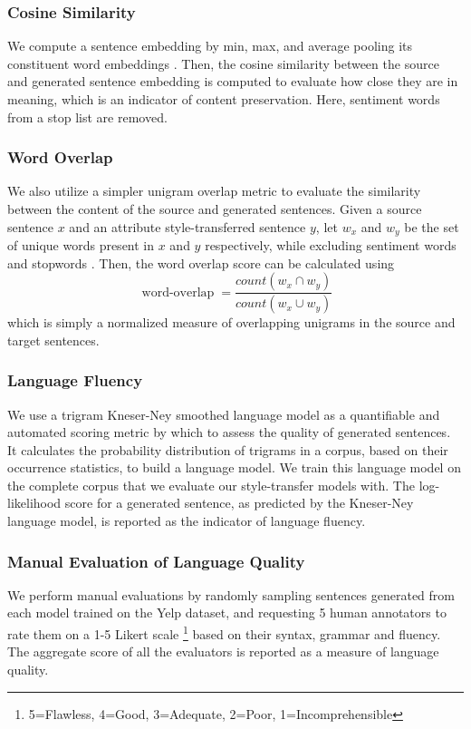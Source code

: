 \documentclass[letterpaper]{article} %
\begin{document}
\subsubsection{Cosine Similarity}
We compute a sentence embedding by min, max, and average pooling its constituent word embeddings \cite{fu2017style}.
Then, the cosine similarity between the source and generated sentence embedding is computed to evaluate how close they are in meaning, which is an indicator of content preservation.
Here, sentiment words from a stop list \cite{hu2004mining} are removed.

\subsubsection{Word Overlap}
We also utilize a simpler unigram overlap metric to evaluate the similarity between the content of the source and generated sentences.
Given a source sentence $x$ and an attribute style-transferred sentence $y$, let $w_x$ and $w_y$ be the set of unique words present in $x$ and $y$ respectively, while excluding sentiment words \cite{hu2004mining} and stopwords \cite{bird2004nltk}.
Then, the word overlap score can be calculated using $$\operatorname{word-overlap} = \frac{count(w_x \cap w_y)}{count(w_x \cup w_y)}$$ which is simply a normalized measure of overlapping unigrams in the source and target sentences.

\subsubsection{Language Fluency}
We use a trigram Kneser-Ney smoothed language model \cite{kneser1995improved} as a quantifiable and automated scoring metric by which to assess the quality of generated sentences.
It calculates the probability distribution of trigrams in a corpus, based on their occurrence statistics, to build a language model.
We train this language model on the complete corpus that we evaluate our style-transfer models with.
The log-likelihood score for a generated sentence, as predicted by the Kneser-Ney language model, is reported as the indicator of language fluency.

\subsubsection{Manual Evaluation of Language Quality}
We perform manual evaluations by randomly sampling sentences generated from each model trained on the Yelp dataset, and requesting 5 human annotators to rate them on a 1-5 Likert scale \footnote{5=Flawless, 4=Good, 3=Adequate, 2=Poor, 1=Incomprehensible} \cite{stent2005evaluating} based on their syntax, grammar and fluency.
The aggregate score of all the evaluators is reported as a measure of language quality.
\end{document}
